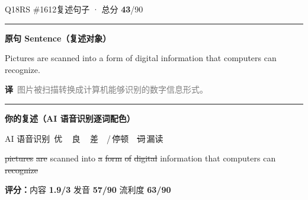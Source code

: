 \documentclass[11pt]{article}
\newcommand{\sfull}[1]{\textcolor{cFix}{\bfseries #1}}     %
\newcommand{\spart}[1]{\textcolor{cPartial}{\bfseries #1}} %
\newcommand{\ptesub}[1]{%
  \par\needspace{2\baselineskip}\smallskip
  {\color{cAccent}\rule[-0.2ex]{3pt}{1.05em}}\hspace{6pt}%
  {\bfseries\color{cHead}#1}\par\nopagebreak\smallskip}
\newcommand{\sg}[1]{\textcolor{cSpkGood}{#1}}   %
\newcommand{\smiss}[1]{\textcolor{cSpkBad}{\sout{#1}}}  %
\newcommand{\asrlegend}{{\footnotesize\color{gray}AI 语音识别\quad
  {\color{cSpkGood}\textbullet}\,优\ \ {\color{cSpkOk}\textbullet}\,良\ \
  {\color{cSpkBad}\textbullet}\,差\ \ {\color{gray}/}\,停顿\ \
  {\color{cSpkBad}\sout{词}}\,漏读}}
\newcommand{\zh}[1]{{\footnotesize\textcolor{cNote}{\textbf{译}}\ \textcolor{gray}{#1}}}
\begin{document}
\begin{qblock}{Q18\quad RS \#1612}{复述句子 · 总分 \textcolor{cAccent}{\bfseries 43}/90}
\ptesub{原句 Sentence（复述对象）}
\begin{promptbox}
Pictures are scanned into a form of digital information that computers can recognize.
\end{promptbox}
\zh{图片被扫描转换成计算机能够识别的数字信息形式。}
\ptesub{你的复述（AI 语音识别逐词配色）}
\asrlegend
\begin{asrbox}
\smiss{pictures} \smiss{are} \sg{scanned} \sg{into} \smiss{a} \smiss{form} \smiss{of} \smiss{digital} \sg{information} \sg{that} \sg{computers} \sg{can} \smiss{recognize}
\end{asrbox}
\smallskip
{\small\textbf{评分：}内容 \spart{1.9/3} \quad\textperiodcentered\quad 发音 \spart{57/90} \quad\textperiodcentered\quad 流利度 \sfull{63/90}}
\end{qblock}
\end{document}
